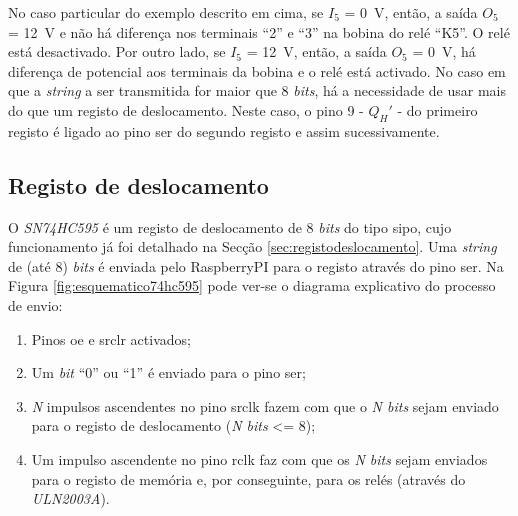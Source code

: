 No caso particular do exemplo descrito em cima, se $I_{5}$ = \SI{0}{\volt}, então, a saída $O_{5}$ = \SI{12}{\volt} e não há diferença nos terminais ``2'' e ``3'' na bobina do relé  ``K5''. O relé está desactivado. Por outro lado, se $I_{5}$ = \SI{12}{\volt}, então, a saída $O_{5}$ = \SI{0}{\volt}, há diferença de potencial aos terminais da bobina e o relé está activado. No caso em que a \textit{string} a ser transmitida for maior que 8 \textit{bits}, há a necessidade de usar mais do que um registo de deslocamento. Neste caso, o pino 9 - $Q_{H}'$ - do primeiro registo é ligado ao pino \acrshort{ser} do segundo registo e assim sucessivamente.

\subsection{Registo de deslocamento}
\label{sec:hwregistodeslocamento}
O \textit{SN74HC595} é um registo de deslocamento de 8 \textit{bits} do tipo \acrshort{sipo}, cujo funcionamento já foi detalhado na Secção \ref{sec:registodeslocamento}. Uma \textit{string} de (até 8) \textit{bits} é enviada pelo \gls{RaspberryPI} para o registo através do pino \acrshort{ser}. Na Figura \ref{fig:esquematico74hc595} pode ver-se o diagrama explicativo do processo de envio:

\begin{enumerate}
	\item Pinos \acrshort{oe} e \acrshort{srclr} activados;
	\item Um \textit{bit} ``0'' ou ``1'' é enviado para o pino \acrshort{ser};
	\item \textit{N} impulsos ascendentes no pino \acrshort{srclk} fazem com que o \textit{N bits} sejam enviado para o registo de deslocamento (\textit{N bits} <= 8);
	\item Um impulso ascendente no pino \acrshort{rclk} faz com que os \textit{N bits} sejam enviados para o registo de memória e, por conseguinte, para os relés (através do \textit{ULN2003A}).
\end{enumerate}


